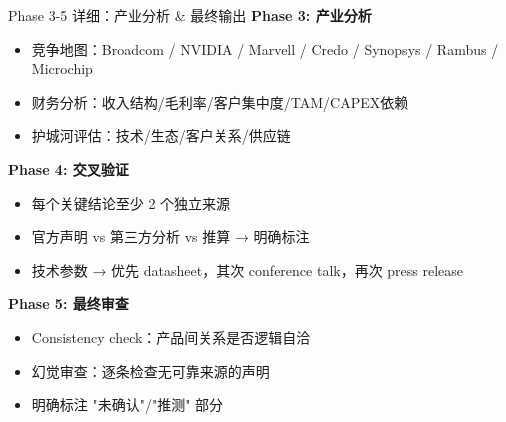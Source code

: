 \documentclass[UTF8,11pt,aspectratio=169]{beamer}
\begin{document}
\begin{frame}{Phase 3-5 详细：产业分析 \& 最终输出}
    \textbf{Phase 3: 产业分析}
    \begin{itemize}
        \item 竞争地图：Broadcom / NVIDIA / Marvell / Credo / Synopsys / Rambus / Microchip
        \item 财务分析：收入结构/毛利率/客户集中度/TAM/CAPEX依赖
        \item 护城河评估：技术/生态/客户关系/供应链
    \end{itemize}

    \vspace{0.3cm}
    \textbf{Phase 4: 交叉验证}
    \begin{itemize}
        \item 每个关键结论至少 2 个独立来源
        \item 官方声明 vs 第三方分析 vs 推算 → 明确标注
        \item 技术参数 → 优先 datasheet，其次 conference talk，再次 press release
    \end{itemize}

    \vspace{0.3cm}
    \textbf{Phase 5: 最终审查}
    \begin{itemize}
        \item Consistency check：产品间关系是否逻辑自洽
        \item 幻觉审查：逐条检查无可靠来源的声明
        \item 明确标注 "未确认"/"推测" 部分
    \end{itemize}
\end{frame}
\end{document}
